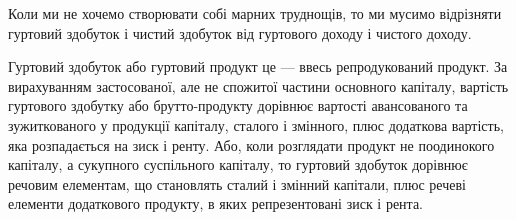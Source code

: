 Коли ми не хочемо створювати собі марних труднощів, то ми мусимо відрізняти
гуртовий здобуток і чистий здобуток від гуртового доходу і чистого
доходу.

Гуртовий здобуток або гуртовий продукт це — ввесь репродукований продукт.
За вирахуванням застосованої, але не спожитої частини основного капіталу,
вартість гуртового здобутку або брутто-продукту дорівнює вартості
авансованого та зужиткованого у продукції капіталу, сталого і змінного, плюс
додаткова вартість, яка розпадається на зиск і ренту. Або, коли розглядати
продукт не поодинокого капіталу, а сукупного суспільного капіталу, то гуртовий
здобуток дорівнює речовим елементам, що становлять сталий і змінний
капітали, плюс речеві елементи додаткового продукту, в яких репрезентовані
зиск і рента.
